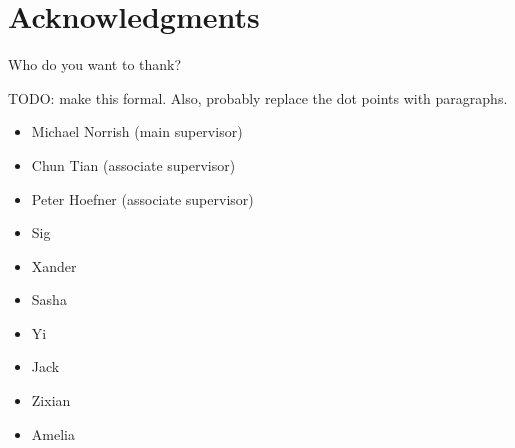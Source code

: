 \chapter*{Acknowledgments}
Who do you want to thank?

TODO: make this formal. Also, probably replace the dot points with paragraphs.

\begin{itemize}
\item{Michael Norrish (main supervisor)}
\item{Chun Tian (associate supervisor)}
\item{Peter Hoefner (associate supervisor)}
\item{Sig}
\item{Xander}
\item{Sasha}
\item{Yi}
\item{Jack}
\item{Zixian}
\item{Amelia}
\end{itemize}